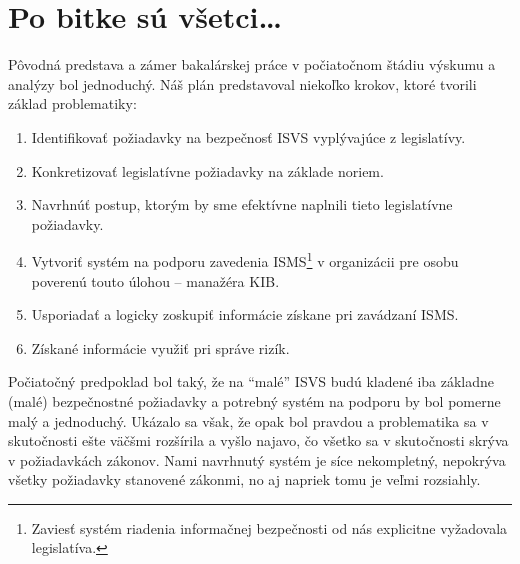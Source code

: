 \chapter{Po bitke sú všetci\ldots} \label{ch:after-the-battle}

Pôvodná predstava a zámer bakalárskej práce v počiatočnom štádiu výskumu a analýzy bol jednoduchý. Náš plán predstavoval
niekoľko krokov, ktoré tvorili základ problematiky:
\begin{enumerate}
  \item Identifikovať požiadavky na bezpečnosť ISVS vyplývajúce z legislatívy.
  \item Konkretizovať legislatívne požiadavky na základe noriem. 
  \item Navrhnúť postup, ktorým by sme efektívne naplnili tieto legislatívne požiadavky.
  \item Vytvoriť systém na podporu zavedenia ISMS\footnote{Zaviesť systém riadenia informačnej bezpečnosti od nás explicitne
    vyžadovala legislatíva.} v organizácii pre osobu poverenú touto úlohou -- manažéra KIB.
  \item Usporiadať a logicky zoskupiť informácie získane pri zavádzaní ISMS.
  \item Získané informácie využiť pri správe rizík.
\end{enumerate}

Počiatočný predpoklad bol taký, že na \enquote{malé} ISVS budú kladené iba základne (malé) bezpečnostné požiadavky a potrebný
systém na podporu by bol pomerne malý a jednoduchý. Ukázalo sa však, že opak bol pravdou a problematika sa v skutočnosti
ešte väčšmi rozšírila a vyšlo najavo, čo všetko sa v skutočnosti skrýva v požiadavkách zákonov. Nami navrhnutý systém je
síce nekompletný, nepokrýva všetky požiadavky stanovené zákonmi, no aj napriek tomu je veľmi rozsiahly.

